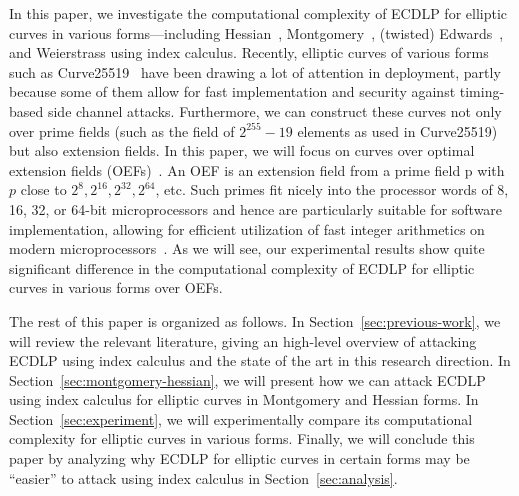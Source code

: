 In this paper, we investigate the computational complexity of ECDLP
for elliptic curves in various forms---including
Hessian~\cite{DBLP:conf/ches/Smart01},
Montgomery~\cite{1987-montgomery}, (twisted)
Edwards~\cite{DBLP:journals/iacr/BernsteinL07,DBLP:journals/iacr/BernsteinBJLP08},
and Weierstrass using index calculus.
%
Recently, elliptic curves of various forms such as
Curve25519~\cite{DBLP:conf/pkc/Bernstein06} have been drawing a lot of
attention in deployment, partly because some of them allow for fast
implementation and security against timing-based side channel attacks.
%
Furthermore, we can construct these curves not only over prime fields
(such as the field of $2^{255} - 19$ elements as used in Curve25519)
but also extension fields.
%
In this paper, we will focus on curves over optimal extension fields
(OEFs)~\cite{DBLP:conf/crypto/BaileyP98}.
%
An OEF is an extension field from a prime field \F p with $p$ close to
$2^8, 2^{16}, 2^{32}, 2^{64}$, etc.
%
Such primes fit nicely into the processor words of 8, 16, 32, or
64-bit microprocessors and hence are particularly suitable for
software implementation, allowing for efficient utilization of fast
integer arithmetics on modern
microprocessors~\cite{DBLP:conf/crypto/BaileyP98}.
%
As we will see, our experimental results show quite significant
difference in the computational complexity of ECDLP for elliptic
curves in various forms over OEFs.

The rest of this paper is organized as follows.
%
In Section~\ref{sec:previous-work}, we will review the relevant
literature, giving an high-level overview of attacking ECDLP using
index calculus and the state of the art in this research direction.
%
In Section~\ref{sec:montgomery-hessian}, we will present how we can
attack ECDLP using index calculus for elliptic curves in Montgomery
and Hessian forms.
%
In Section~\ref{sec:experiment}, we will experimentally compare its
computational complexity for elliptic curves in various forms.
%
Finally, we will conclude this paper by analyzing why ECDLP for
elliptic curves in certain forms may be ``easier'' to attack using
index calculus in Section~\ref{sec:analysis}.
%
